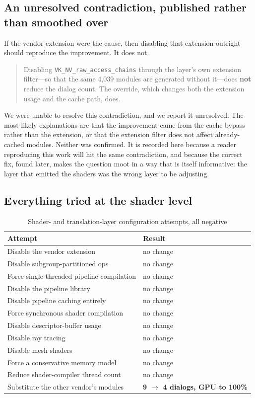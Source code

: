 \subsection{An unresolved contradiction, published rather than smoothed over}

If the vendor extension were the cause, then disabling that extension outright
should reproduce the improvement. It does not.

\begin{quote}
Disabling \verb|VK_NV_raw_access_chains| through the layer's own extension
filter---so that the same 4{,}039 modules are generated without it---does
\textbf{not} reduce the dialog count. The override, which changes both the
extension usage and the cache path, does.
\end{quote}

We were unable to resolve this contradiction, and we report it unresolved. The
most likely explanations are that the improvement came from the cache bypass
rather than the extension, or that the extension filter does not affect
already-cached modules. Neither was confirmed. It is recorded here because a
reader reproducing this work will hit the same contradiction, and because the
correct fix, found later, makes the question moot in a way that is itself
informative: the layer that emitted the shaders was the wrong layer to be
adjusting.

\subsection{Everything tried at the shader level}

\begin{table}[htbp]
\caption{Shader- and translation-layer configuration attempts, all negative}
\label{tab:shaderelim}
\centering
\footnotesize
\begin{tabularx}{\columnwidth}{@{}L{4.2cm}X@{}}
\toprule
\textbf{Attempt} & \textbf{Result} \\
\midrule
Disable the vendor extension & no change \\
Disable subgroup-partitioned ops & no change \\
Force single-threaded pipeline compilation & no change \\
Disable the pipeline library & no change \\
Disable pipeline caching entirely & no change \\
Force synchronous shader compilation & no change \\
Disable descriptor-buffer usage & no change \\
Disable ray tracing & no change \\
Disable mesh shaders & no change \\
Force a conservative memory model & no change \\
Reduce shader-compiler thread count & no change \\
Substitute the other vendor's modules & \textbf{9 $\to$ 4 dialogs, GPU to
                                        100\%} \\
\bottomrule
\end{tabularx}
\end{table}

